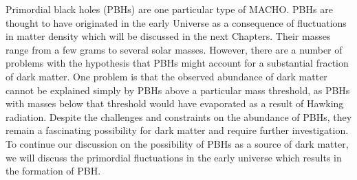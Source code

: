 \hspace{0.5cm}Primordial black holes (PBHs) are one particular type of MACHO. PBHs are thought to have originated in the early Universe as a consequence of fluctuations in matter density which will be discussed in the next Chapters. Their masses range from a few grams to several solar masses.
However, there are a number of problems with the hypothesis that PBHs might account for a substantial fraction of dark matter. One problem is that the observed abundance of dark matter cannot be explained simply by PBHs above a particular mass threshold, as PBHs with masses below that threshold would have evaporated as a result of Hawking radiation. Despite the challenges and constraints on the abundance of PBHs, they remain a fascinating possibility for dark matter and require further investigation. To continue our discussion on the possibility of PBHs as a source of dark matter, we will discuss the primordial fluctuations in the early universe which results in the formation of PBH.


